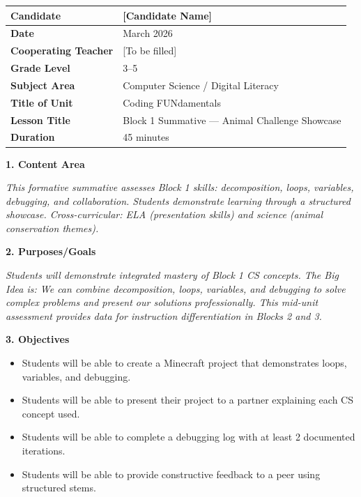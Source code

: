 \documentclass[11pt,letterpaper]{article}
\begin{document}
\begin{longtable}{|L{0.28\textwidth}|L{0.65\textwidth}|}
\hline
\textbf{Candidate}  & [Candidate Name]  \\
\hline
\textbf{Date}  & March 2026  \\
\hline
\textbf{Cooperating Teacher}  & [To be filled]  \\
\hline
\textbf{Grade Level}  & 3--5  \\
\hline
\textbf{Subject Area}  & Computer Science / Digital Literacy  \\
\hline
\textbf{Title of Unit}  & Coding FUNdamentals  \\
\hline
\textbf{Lesson Title}  & Block 1 Summative --- Animal Challenge Showcase  \\
\hline
\textbf{Duration}  & 45 minutes  \\
\hline
\end{longtable}

\textbf{1. Content Area}

\textit{This formative summative assesses Block 1 skills: decomposition, loops, variables, debugging, and collaboration. Students demonstrate learning through a structured showcase. Cross-curricular: ELA (presentation skills) and science (animal conservation themes).}

\textbf{2. Purposes/Goals}

\textit{Students will demonstrate integrated mastery of Block 1 CS concepts. The Big Idea is: We can combine decomposition, loops, variables, and debugging to solve complex problems and present our solutions professionally. This mid-unit assessment provides data for instruction differentiation in Blocks 2 and 3.}

\textbf{3. Objectives}

\begin{itemize}
  \item Students will be able to create a Minecraft project that demonstrates loops, variables, and debugging.

  \item Students will be able to present their project to a partner explaining each CS concept used.

  \item Students will be able to complete a debugging log with at least 2 documented iterations.

  \item Students will be able to provide constructive feedback to a peer using structured stems.
\end{itemize}
\end{document}

